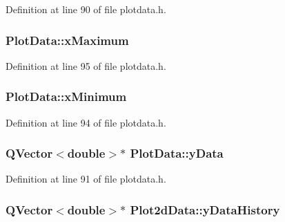 Definition at line 90 of file plotdata.\-h.

\hypertarget{group___scope_plugin_ga8d380f3d20ca5102bd641b5475238da6}{
\subsubsection[{x\-Maximum}]{ Plot\-Data\-::x\-Maximum\hspace{0.3cm}{\ttfamily [protected]}}}\label{group___scope_plugin_ga8d380f3d20ca5102bd641b5475238da6}


Definition at line 95 of file plotdata.\-h.

\hypertarget{group___scope_plugin_ga2115389376ac088ccc03fcb8a2279f8a}{
\subsubsection[{x\-Minimum}]{ Plot\-Data\-::x\-Minimum\hspace{0.3cm}{\ttfamily [protected]}}}\label{group___scope_plugin_ga2115389376ac088ccc03fcb8a2279f8a}


Definition at line 94 of file plotdata.\-h.

\hypertarget{group___scope_plugin_ga0544d6bcbe24fc0bb460123547821457}{
\subsubsection[{y\-Data}]{\setlength{\rightskip}{0pt plus 5cm}Q\-Vector$<${\bf double}$>$$\ast$ Plot\-Data\-::y\-Data\hspace{0.3cm}{\ttfamily [protected]}}}\label{group___scope_plugin_ga0544d6bcbe24fc0bb460123547821457}


Definition at line 91 of file plotdata.\-h.

\hypertarget{group___scope_plugin_ga3f05450290135f9d3b69ab0119718f11}{
\subsubsection[{y\-Data\-History}]{\setlength{\rightskip}{0pt plus 5cm}Q\-Vector$<${\bf double}$>$$\ast$ Plot2d\-Data\-::y\-Data\-History}}\label{group___scope_plugin_ga3f05450290135f9d3b69ab0119718f11}


